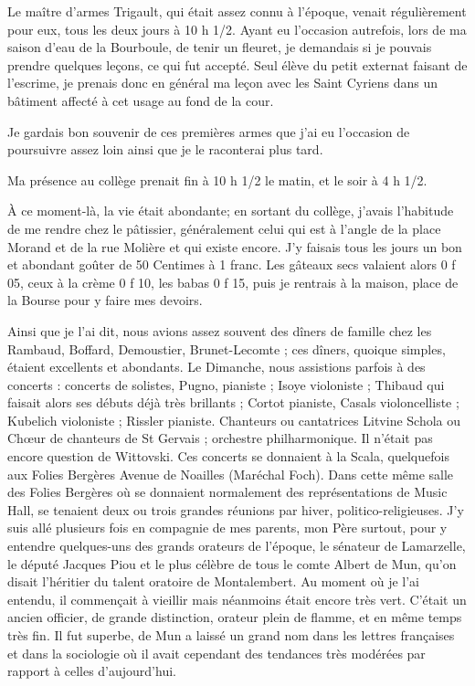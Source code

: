 \documentclass[11pt,a4paper]{report}
\begin{document}
Le maître d'armes Trigault, qui était assez connu à l'époque, venait régulièrement pour eux, tous les deux jours à 10 h 1/2. Ayant eu l'occasion autrefois, lors de ma saison d'eau de la Bourboule, de tenir un fleuret, je demandais si je pouvais prendre quelques leçons, ce qui fut accepté. Seul élève du petit externat faisant de l'escrime, je prenais donc en général ma leçon avec les Saint Cyriens dans un bâtiment affecté à cet usage au fond de la cour.

Je gardais bon souvenir de ces premières armes que j'ai eu l'occasion de poursuivre assez loin ainsi que je le raconterai plus tard.

Ma présence au collège prenait fin à 10 h 1/2 le matin, et le soir à 4 h 1/2.

À ce moment-là, la vie était abondante; en sortant du collège, j'avais l'habitude de me rendre chez le pâtissier, généralement celui qui est à l'angle de la place Morand et de la rue Molière et qui existe encore. J'y faisais tous les jours un bon et abondant goûter de 50 Centimes à 1 franc. Les gâteaux secs valaient alors 0 f 05, ceux à la crème 0 f 10, les babas 0 f 15, puis je rentrais à la maison, place de la Bourse pour y faire mes devoirs.

Ainsi que je l'ai dit, nous avions assez souvent des dîners de famille chez les Rambaud, Boffard, Demoustier, Brunet-Lecomte ; ces dîners, quoique simples, étaient excellents et abondants. Le Dimanche, nous assistions parfois à des concerts : concerts de solistes, Pugno, pianiste ; Isoye violoniste ; Thibaud qui faisait alors ses débuts déjà très brillants ; Cortot pianiste, Casals violoncelliste ; Kubelich violoniste ; Rissler pianiste. Chanteurs ou cantatrices Litvine Schola ou Chœur de chanteurs de St Gervais ; orchestre philharmonique. Il n'était pas encore question de Wittovski. Ces concerts se donnaient à la Scala, quelquefois aux Folies Bergères Avenue de Noailles (Maréchal Foch). Dans cette même salle des Folies Bergères où se donnaient normalement des représentations de Music Hall, se tenaient deux ou trois grandes réunions par hiver, politico-religieuses. J'y suis allé plusieurs fois en compagnie de mes parents, mon Père surtout, pour y entendre quelques-uns des grands orateurs de l'époque, le sénateur de Lamarzelle, le député Jacques Piou et le plus célèbre de tous le comte Albert de Mun, qu'on disait l'héritier du talent oratoire de Montalembert. Au moment où je l'ai entendu, il commençait à vieillir mais néanmoins était encore très vert. C'était un ancien officier, de grande distinction, orateur plein de flamme, et en même temps très fin. Il fut superbe, de Mun a laissé un grand nom dans les lettres françaises et dans la sociologie où il avait cependant des tendances très modérées par rapport à celles d'aujourd'hui.
\end{document}
